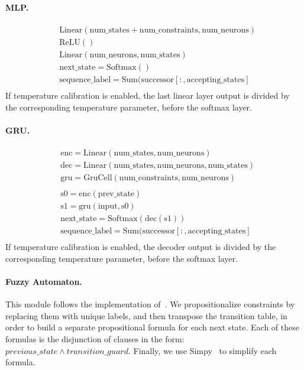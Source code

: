 \paragraph{MLP.}
\begin{align*}
	&\mathrm{Linear(num\_states + num\_constraints, num\_neurons)}\\
	&\mathrm{ReLU()}\\
	&\mathrm{Linear(num\_neurons, num\_states)}\\
	&\mathrm{next\_state = Softmax()}\\
	&\mathrm{sequence\_label = Sum(successor[:, accepting\_states]}\\
\end{align*}
If temperature calibration is enabled, the last linear layer output is divided by the corresponding temperature parameter, before the softmax layer.

\paragraph{GRU.}
\begin{align*}
	&\mathrm{enc = Linear(num\_states, num\_neurons)}\\
	&\mathrm{dec = Linear(num\_states, num\_neurons, num\_states)}\\
	&\mathrm{gru = GruCell(num\_constraints, num\_neurons)}\\
	\\
	&\mathrm{s0 = enc(prev\_state)}\\
	&\mathrm{s1 = gru(input, s0)}\\
	&\mathrm{next\_state = Softmax(dec(s1))}\\
	&\mathrm{sequence\_label = Sum(successor[:, accepting\_states]}\\
\end{align*}
If temperature calibration is enabled, the decoder output is divided by the corresponding temperature parameter, before the softmax layer.

\paragraph{Fuzzy Automaton.}
This module follows the implementation of~\cite{umili2023grounding}. We propositionalize constraints by replacing them with unique labels, and then transpose the transition table, in order to build a separate propositional formula for each next state. Each of these formulas is the disjunction of clauses in the form: $previous\_state \wedge transition\_guard$. Finally, we use Simpy~\cite{meurer2017sympy} to simplify each formula.


